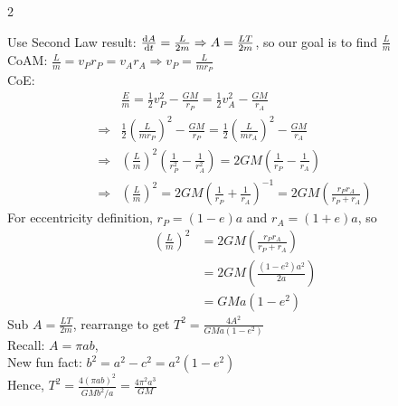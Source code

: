 \documentclass[10pt, portrait]{article}
\begin{document}
\begin{multicols*}{2}
\begin{itemize}
    Use Second Law result: $\dv{A}{t} = \frac{L}{2m} \Rightarrow A = \frac{LT}{2m}$, so our goal is to find $\frac{L}{m}$ \\
    CoAM: $\frac{L}{m} = v_Pr_P = v_Ar_A \Rightarrow v_P = \frac{L}{mr_P}$ \\
    CoE:
    \[
    \begin{aligned}
        &\frac{E}{m} = \frac{1}{2}v_P^2 - \frac{GM}{r_P} = \frac{1}{2}v_A^2 - \frac{GM}{r_A} \\
        \Rightarrow &\frac{1}{2}\left(\frac{L}{mr_P}\right)^2 - \frac{GM}{r_P} = \frac{1}{2}\left(\frac{L}{mr_A}\right)^2 - \frac{GM}{r_A} \\
        \Rightarrow &\left(\frac{L}{m}\right)^2 \left(\frac{1}{r_P^2} - \frac{1}{r_A^2}\right) = 2GM \left(\frac{1}{r_P} - \frac{1}{r_A}\right) \\
        \Rightarrow &\left(\frac{L}{m}\right)^2 = 2GM\left( \frac{1}{r_P} + \frac{1}{r_A} \right)^{-1} = 2GM\left(\frac{r_Pr_A}{r_P + r_A}\right)
    \end{aligned}
    \]
    For eccentricity definition, $r_P = (1 - e)a$ and $r_A = (1 + e)a$, so \\
    \[
    \begin{aligned}
        \left(\frac{L}{m}\right)^2 &= 2GM\left(\frac{r_Pr_A}{r_P + r_A}\right) \\
        &= 2GM\left(\frac{(1-e^2)a^2}{2a}\right) \\
        &= GMa(1 - e^2)
    \end{aligned}
    \]
    Sub $A = \frac{LT}{2m}$, rearrange to get $T^2 = \frac{4A^2}{GMa(1-e^2)}$ \\
    Recall: $A = \pi ab$, \\
    New fun fact: $b^2 = a^2 - c^2 = a^2(1 - e^2)$ \\
    Hence, $T^2 = \frac{4(\pi ab)^2}{GMb^2/a} = \frac{4\pi^2a^3}{GM}$    
\end{itemize}

\end{multicols*}
\end{document}
